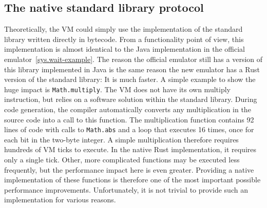 \subsection{The native standard library protocol} \label{jack-stdlib-in-rust}
Theoretically, the VM could simply use the implementation of the standard library written directly in bytecode.
From a functionality point of view, this implementation is almost identical to the Java implementation in the official emulator~\ref{sys.wait-example}.
The reason the official emulator still has a version of this library implemented in Java is the same reason the new emulator has a Rust version of the standard library:
It is much faster.
A simple example to show the huge impact is \verb+Math.multiply+.
The VM does not have its own multiply instruction, but relies on a software solution within the standard library.
During code generation, the compiler automatically converts any multiplication in the source code into a call to this function.
The multiplication function contains 92 lines of code with calls to \verb+Math.abs+ and a loop that executes 16 times, once for each bit in the two-byte integer.
A simple multiplication therefore requires hundreds of VM ticks to execute.
In the native Rust implementation, it requires only a single tick.
Other, more complicated functions may be executed less frequently, but the performance impact here is even greater.
Providing a native implementation of these functions is therefore one of the most important possible performance improvements.
Unfortunately, it is not trivial to provide such an implementation for various reasons.

